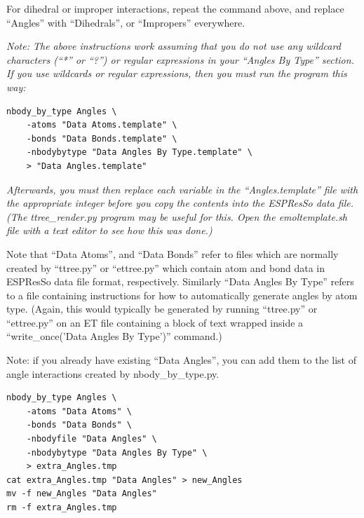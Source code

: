 \documentclass[11pt]{article}
\begin{document}
For dihedral or improper interactions, repeat the command above, and 
replace ``Angles'' with ``Dihedrals'', or ``Impropers'' everywhere.

\textit{Note:
The above instructions work assuming that you do not use any 
wildcard characters (``*'' or ``?'') 
or regular expressions 
in your ``Angles By Type'' section.
If you use wildcards or regular expressions, 
then you must run the program this way:
}
\begin{verbatim}
nbody_by_type Angles \
    -atoms "Data Atoms.template" \
    -bonds "Data Bonds.template" \
    -nbodybytype "Data Angles By Type.template" \
    > "Data Angles.template"
\end{verbatim}
\textit{
Afterwards, you must then replace each variable in the 
``Angles.template'' file with the appropriate integer 
before you copy the contents into the ESPResSo data file.
(The ttree\_render.py program may be useful for this.
 Open the emoltemplate.sh file with a text editor to 
 see how this was done.)
}

Note that ``Data Atoms'', and ``Data Bonds'' refer to files which are normally
created by ``ttree.py'' or ``ettree.py'' which
contain atom and bond data in ESPResSo data file format, respectively.
Similarly ``Data Angles By Type'' refers to a file 
containing instructions for how to automatically generate angles by atom type.
(Again, this would typically be generated by running ``ttree.py'' or 
 ``ettree.py'' on an ET file containing a block of text wrapped 
 inside a ``write\_once('Data Angles By Type')'' command.)

Note: if you already have existing ``Data Angles'', you can add them to 
the list of angle interactions created by nbody\_by\_type.py.

\begin{verbatim}
nbody_by_type Angles \
    -atoms "Data Atoms" \
    -bonds "Data Bonds" \
    -nbodyfile "Data Angles" \
    -nbodybytype "Data Angles By Type" \
    > extra_Angles.tmp
cat extra_Angles.tmp "Data Angles" > new_Angles
mv -f new_Angles "Data Angles"
rm -f extra_Angles.tmp
\end{verbatim}
\end{document}
